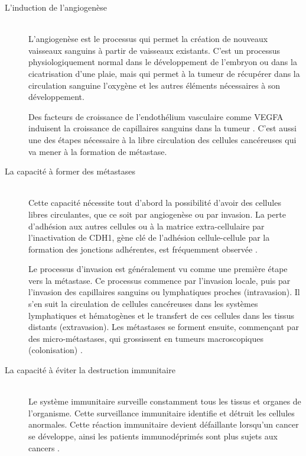 \begin{description}
				\item [L'induction de l'angiogenèse]                            \hfill \\
					L'angiogenèse est le processus qui permet la création de nouveaux vaisseaux sanguins à partir de vaisseaux existants.
					C'est un processus physiologiquement normal dans le développement de l'embryon ou dans la cicatrisation d'une plaie, mais qui permet à la tumeur de récupérer dans la circulation sanguine l'oxygène et les autres éléments nécessaires à son développement.

					Des facteurs de croissance de l'endothélium vasculaire comme \acs{VEGFA} induisent la croissance de capillaires sanguins dans la tumeur \citep{Lu2012}.
					C'est aussi une des étapes nécessaire à la libre circulation des cellules cancéreuses qui va mener à la formation de métastase.

				\item [La capacité à former des métastases]                     \hfill \\
					Cette capacité nécessite tout d'abord la possibilité d'avoir des cellules libres circulantes, que ce soit par angiogenèse ou par invasion.
					La perte d'adhésion aux autres cellules ou à la matrice extra-cellulaire par l'inactivation de \acs{CDH1}, gène clé de l'adhésion cellule-cellule par la formation des jonctions adhérentes, est fréquemment observée \citep{Berx2009}.

					Le processus d'invasion est généralement vu comme une première étape vers la métastase.
					Ce processus commence par l'invasion locale, puis par l'invasion des capillaires sanguins ou lymphatiques proches (intravasion).
					Il s'en suit la circulation de cellules cancéreuses dans les systèmes lymphatiques et hématogènes et le transfert de ces cellules dans les tissus distants (extravasion).
					Les métastases se forment ensuite, commençant par des micro-métastases, qui grossissent en tumeurs macroscopiques (colonisation) \citep{Talmadge2010}.

				\item [La capacité à éviter la destruction immunitaire]         \hfill \\
					Le système immunitaire surveille constamment tous les tissus et organes de l'organisme.
					Cette surveillance immunitaire identifie et détruit les cellules anormales.
					Cette réaction immunitaire devient défaillante lorsqu'un cancer se développe, ainsi les patients immunodéprimés sont plus sujets aux cancers \citep{Vajdic2010}.


\end{description}
